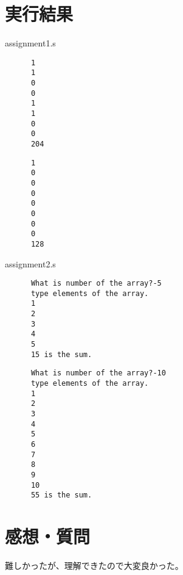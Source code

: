 \documentclass{jarticle}
\begin{document}
  \section{実行結果}
    assignment1.s
    \begin{lstlisting}
      1
      1
      0
      0
      1
      1
      0
      0
      204
    \end{lstlisting}
    \begin{lstlisting}
      1
      0
      0
      0
      0
      0
      0
      0
      128
    \end{lstlisting}

    assignment2.s
    \begin{lstlisting}
      What is number of the array?-5
      type elements of the array.
      1
      2
      3
      4
      5
      15 is the sum.
    \end{lstlisting}
    \begin{lstlisting}
      What is number of the array?-10
      type elements of the array.
      1
      2
      3
      4
      5
      6
      7
      8
      9
      10
      55 is the sum.
    \end{lstlisting}
  \section{感想・質問}
  難しかったが、理解できたので大変良かった。
\end{document}
